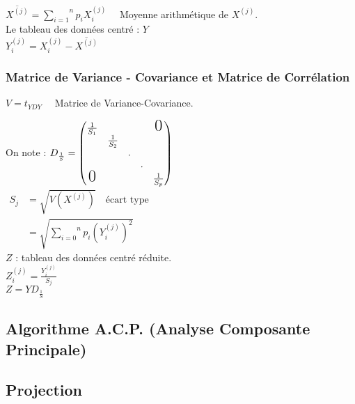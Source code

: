 \documentclass[a4paper, 12pt]{article}
\begin{document}
\begin{flushleft}
$\overline{X^{(j)}} = \overset{n}{\underset{i = 1}{\sum}} p_i X^{(j)}_{i} \quad$ Moyenne arithmétique de $X^{(j)}$. \\

Le tableau des données centré : $Y$ \\
\medskip
$\boxed{Y^{(j)}_i = X^{(j)}_i - \overline{X^{(j)}}}$
\end{flushleft}


\subsubsection{Matrice de Variance - Covariance et Matrice de Corrélation}
$\boxed{V = t_{YDY}} \quad$ Matrice de Variance-Covariance. \\

\begin{flushleft}
On note :
$
D_{\frac{1}{S}} =
\begin{pmatrix}
\frac{1}{S_1} & & & & \text{\LARGE 0} \\
& \frac{1}{S_2} & & & \\
& & . & & \\
& & & .  &\\
\text{\LARGE 0} & & & & \frac{1}{S_p}\\
\end{pmatrix}
$ \\
\medskip
$
\begin{aligned}
S_j &= \sqrt{V(X^{(j)})} \quad \text{écart type} \\
&= \sqrt{\overset{n}{\underset{i = 0}{\sum}} p_i \left (Y^{(j)}_i \right )^2}
\end{aligned}
$ \\
\medskip
$Z$ : tableau des données centré réduite. \\
\medskip
$\boxed{Z^{(j)}_i = \frac{Y^{(j)}_i}{S_j}}$ \\
\medskip
$\boxed{Z = YD_{\frac{1}{S}}}$
\end{flushleft}


\subsection{Algorithme A.C.P. (Analyse Composante Principale)}
\subsection{Projection}
\end{document}
